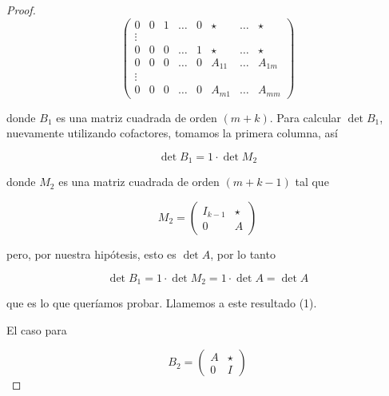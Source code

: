 \documentclass[11pt]{article}
\theoremstyle{definition} %
\begin{document}
\begin{proof}
\[\begin{pmatrix}
    0 & 0 & 1 & \dots & 0 & \star & \dots & \star \\

    \vdots \\

    0 & 0 & 0 & \dots & 1 & \star & \dots & \star \\

    0 & 0 & 0 & \dots & 0 & A_{11} & \dots & A_{1m} \\

    \vdots \\

    0 & 0 & 0 & \dots & 0 & A_{m1} & \dots & A_{mm}

\end{pmatrix}
\]



donde $B_1$ es una matriz cuadrada de orden $(m+k)$. Para calcular $\det B_1$, nuevamente utilizando cofactores, tomamos la primera columna, así



\[
\det B_1 = 1 \cdot \det M_2
\]



donde $M_2$ es una matriz cuadrada de orden $(m+k-1)$ tal que 



\[
M_2 = \begin{pmatrix}

    I_{k-1} & \star \\

    0 &A

\end{pmatrix}
\]



pero, por nuestra hipótesis, esto es $\det A$, por lo tanto



 \[
 \det B_1 = 1 \cdot \det M_2 = 1 \cdot \det A = \det A
 \]



que es lo que queríamos probar. Llamemos a este resultado (1).


El caso para



\[
B_2 = \begin{pmatrix}

    A & \star \\

    0 & I

\end{pmatrix}
\]




\end{proof}
\end{document}
